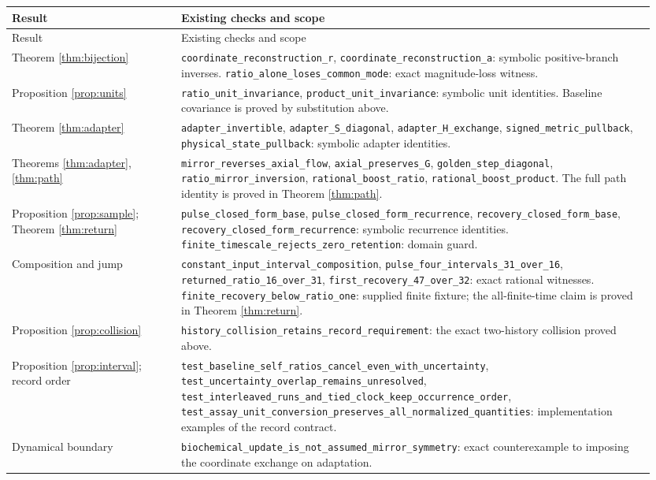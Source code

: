\documentclass[11pt]{article}
\newcommand{\code}[1]{\nolinkurl{#1}}
\begin{document}
\small
\begin{longtable}{@{}>{\raggedright\arraybackslash}p{0.25\linewidth}>{\raggedright\arraybackslash}p{0.70\linewidth}@{}}
\toprule
Result & Existing checks and scope\\
\midrule
\endfirsthead
\toprule
Result & Existing checks and scope\\
\midrule
\endhead
Theorem \ref{thm:bijection}
&
\code{coordinate_reconstruction_r},
\code{coordinate_reconstruction_a}: symbolic positive-branch inverses.
\code{ratio_alone_loses_common_mode}: exact magnitude-loss witness.\\[3pt]
Proposition \ref{prop:units}
&
\code{ratio_unit_invariance},
\code{product_unit_invariance}: symbolic unit identities.
Baseline covariance is proved by substitution above.\\[3pt]
Theorem \ref{thm:adapter}
&
\code{adapter_invertible}, \code{adapter_S_diagonal},
\code{adapter_H_exchange}, \code{signed_metric_pullback},
\code{physical_state_pullback}: symbolic adapter identities.\\[3pt]
Theorems \ref{thm:adapter}, \ref{thm:path}
&
\code{mirror_reverses_axial_flow}, \code{axial_preserves_G},
\code{golden_step_diagonal}, \code{ratio_mirror_inversion},
\code{rational_boost_ratio}, \code{rational_boost_product}.
The full path identity is proved in Theorem \ref{thm:path}.\\[3pt]
Proposition \ref{prop:sample}; Theorem \ref{thm:return}
&
\code{pulse_closed_form_base}, \code{pulse_closed_form_recurrence},
\code{recovery_closed_form_base}, \code{recovery_closed_form_recurrence}:
symbolic recurrence identities.
\code{finite_timescale_rejects_zero_retention}: domain guard.\\[3pt]
Composition and jump
&
\code{constant_input_interval_composition},
\code{pulse_four_intervals_31_over_16},
\code{returned_ratio_16_over_31},
\code{first_recovery_47_over_32}: exact rational witnesses.
\code{finite_recovery_below_ratio_one}: supplied finite fixture;
the all-finite-time claim is proved in Theorem \ref{thm:return}.\\[3pt]
Proposition \ref{prop:collision}
&
\code{history_collision_retains_record_requirement}: the exact
two-history collision proved above.\\[3pt]
Proposition \ref{prop:interval}; record order
&
\code{test_baseline_self_ratios_cancel_even_with_uncertainty},
\code{test_uncertainty_overlap_remains_unresolved},
\code{test_interleaved_runs_and_tied_clock_keep_occurrence_order},
\code{test_assay_unit_conversion_preserves_all_normalized_quantities}:
implementation examples of the record contract.\\[3pt]
Dynamical boundary
&
\code{biochemical_update_is_not_assumed_mirror_symmetry}:
exact counterexample to imposing the coordinate exchange on adaptation.\\
\bottomrule
\end{longtable}
\normalsize
\end{document}
